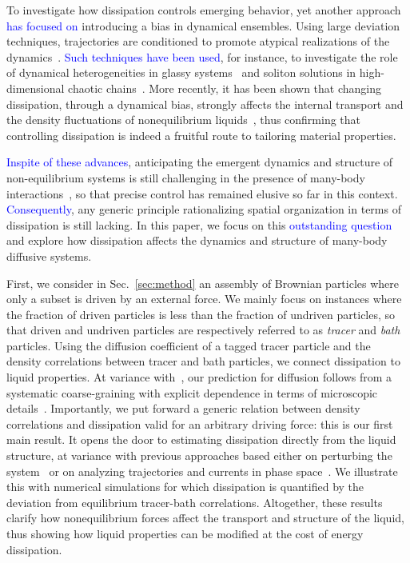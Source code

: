 \documentclass[superscriptaddress, twocolumn, prx, longbibliography, nofootinbib]{revtex4-1}
\begin{document}
To investigate how dissipation controls emerging behavior, yet another approach \textcolor{blue}{has focused on} introducing a bias in dynamical ensembles. Using large deviation techniques, trajectories are conditioned to promote atypical realizations of the dynamics~\cite{Touchette2009, Jack2010}. \textcolor{blue}{Such techniques have been used}, for instance, to investigate the role of dynamical heterogeneities in glassy systems~\cite{garrahan2007, Hedges2009, Pitard2011, Speck2012, Bodineau2012a, Limmer2014, Nemoto2017} and soliton solutions in high-dimensional chaotic chains~\cite{tailleur2007probing, laffargue2013}. More recently, it has been shown that changing dissipation, through a dynamical bias, strongly affects the internal transport and the density fluctuations of nonequilibrium liquids~\cite{Cagnetta2017, nemoto2018optimizing}, thus confirming that controlling dissipation is indeed a fruitful route to tailoring material properties.

\textcolor{blue}{Inspite of these advances}, anticipating the emergent dynamics and structure of non-equilibrium systems is still challenging in the presence of many-body interactions~\cite{Chetrite2013, Jack2010}, so that precise control has remained elusive so far in this context. \textcolor{blue}{Consequently}, any generic principle rationalizing spatial organization in terms of dissipation is still lacking. In this paper, we focus on this \textcolor{blue}{outstanding question} and explore how dissipation affects the dynamics and structure of many-body diffusive systems. 

First, we consider in Sec.~\ref{sec:method} an assembly of Brownian particles where only a subset is driven by an external force. We mainly focus on instances where the fraction of driven particles is less than the fraction of undriven particles, so that driven and undriven particles are respectively referred to as {\it tracer} and {\it bath} particles. Using the diffusion coefficient of a tagged tracer particle and the density correlations between tracer and bath particles, we connect dissipation to liquid properties. At variance with~\cite{delJunco2018}, our prediction for diffusion follows from a systematic coarse-graining with explicit dependence in terms of microscopic details~\cite{Dean1996, Demery2011, Demery2014}. Importantly, we put forward a generic relation between density correlations and dissipation valid for an arbitrary driving force: this is our first main result. It opens the door to estimating dissipation directly from the liquid structure, at variance with previous approaches based either on perturbing the system~\cite{Harada2005, Mizuno2007, Visco2015, Turlier2016, Ahmed2018} or on analyzing trajectories and currents in phase space~\cite{Battle604, Gingrich2017, Roldan2018, Parrondo2018, Li2018}. We illustrate this with numerical simulations for which dissipation is quantified by the deviation from equilibrium tracer-bath correlations. Altogether, these results clarify how nonequilibrium forces affect the transport and structure of the liquid, thus showing how liquid properties can be modified at the cost of energy dissipation.
\end{document}
